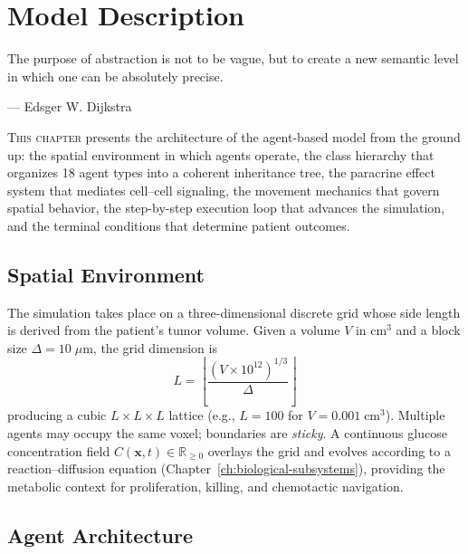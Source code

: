 \chapter{Model Description}
\label{ch:model_description}

\epigraph{The purpose of abstraction is not to be vague, but to create a new semantic level in which one can be absolutely precise.}{--- Edsger W. Dijkstra}

\lettrine[lines=2]{T}{his chapter} presents the architecture of the agent-based model from the ground up: the spatial environment in which agents operate, the class hierarchy that organizes 18 agent types into a coherent inheritance tree, the paracrine effect system that mediates cell--cell signaling, the movement mechanics that govern spatial behavior, the step-by-step execution loop that advances the simulation, and the terminal conditions that determine patient outcomes.

\section{Spatial Environment}
\label{sec:md_spatial}

The simulation takes place on a three-dimensional discrete grid whose side length is derived from the patient's tumor volume.  Given a volume $V$ in cm$^3$ and a block size $\Delta = 10\;\mu\text{m}$, the grid dimension is
\begin{equation}
    L = \left\lfloor \frac{(V \times 10^{12})^{1/3}}{\Delta} \right\rfloor
    \label{eq:grid_dim}
\end{equation}
producing a cubic $L \times L \times L$ lattice (e.g., $L = 100$ for $V = 0.001\;\text{cm}^3$).  Multiple agents may occupy the same voxel; boundaries are \emph{sticky}.  A continuous glucose concentration field $C(\mathbf{x}, t) \in \mathbb{R}_{\geq 0}$ overlays the grid and evolves according to a reaction--diffusion equation (Chapter~\ref{ch:biological-subsystems}), providing the metabolic context for proliferation, killing, and chemotactic navigation.

\section{Agent Architecture}
\label{sec:md_architecture}

